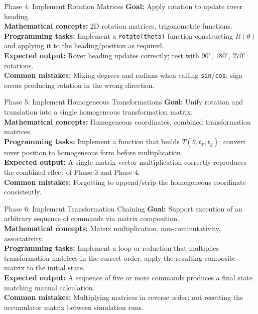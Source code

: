 \documentclass[12pt]{report}
\begin{document}
\begin{phasebox}{Phase 4: Implement Rotation Matrices}
\textbf{Goal:} Apply rotation to update rover heading. \\
\textbf{Mathematical concepts:} 2D rotation matrices, trigonometric functions. \\
\textbf{Programming tasks:} Implement a \texttt{rotate(theta)} function constructing $R(\theta)$ and applying it to the heading/position as required. \\
\textbf{Expected output:} Rover heading updates correctly; test with $90^\circ$, $180^\circ$, $270^\circ$ rotations. \\
\textbf{Common mistakes:} Mixing degrees and radians when calling \texttt{sin}/\texttt{cos}; sign errors producing rotation in the wrong direction.
\end{phasebox}

\begin{phasebox}{Phase 5: Implement Homogeneous Transformations}
\textbf{Goal:} Unify rotation and translation into a single homogeneous transformation matrix. \\
\textbf{Mathematical concepts:} Homogeneous coordinates, combined transformation matrices. \\
\textbf{Programming tasks:} Implement a function that builds $T(\theta, t_x, t_y)$; convert rover position to homogeneous form before multiplication. \\
\textbf{Expected output:} A single matrix-vector multiplication correctly reproduces the combined effect of Phase 3 and Phase 4. \\
\textbf{Common mistakes:} Forgetting to append/strip the homogeneous coordinate consistently.
\end{phasebox}

\begin{phasebox}{Phase 6: Implement Transformation Chaining}
\textbf{Goal:} Support execution of an arbitrary sequence of commands via matrix composition. \\
\textbf{Mathematical concepts:} Matrix multiplication, non-commutativity, associativity. \\
\textbf{Programming tasks:} Implement a loop or reduction that multiplies transformation matrices in the correct order; apply the resulting composite matrix to the initial state. \\
\textbf{Expected output:} A sequence of five or more commands produces a final state matching manual calculation. \\
\textbf{Common mistakes:} Multiplying matrices in reverse order; not resetting the accumulator matrix between simulation runs.
\end{phasebox}
\end{document}
